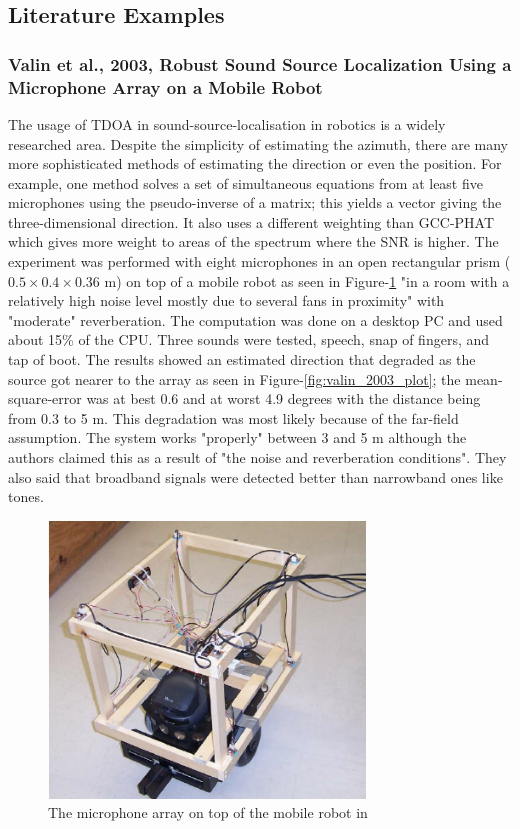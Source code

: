 \documentclass{report}
\begin{document}
\subsection{Literature Examples}

\subsubsection{Valin et al., 2003, Robust Sound Source Localization Using a Microphone Array on a Mobile Robot}

The usage of TDOA in sound-source-localisation in robotics is a widely researched area. Despite the simplicity of estimating the azimuth, there are many more sophisticated methods of estimating the direction or even the position. For example, one method \cite{valin_robust_2003} solves a set of simultaneous equations from at least five microphones using the pseudo-inverse of a matrix; this yields a vector giving the three-dimensional direction. It also uses a different weighting than GCC-PHAT which gives more weight to areas of the spectrum where the SNR is higher. The experiment was performed with eight microphones in an open rectangular prism ($0.5\times 0.4\times 0.36$ \si{m}) on top of a mobile robot as seen in Figure-\ref{fig:valin_2003_robot} "in a room with a relatively high noise level mostly due to several fans in proximity" with "moderate" reverberation. The computation was done on a desktop PC and used about 15\% of the CPU. Three sounds were tested, speech, snap of fingers, and tap of boot. The results showed an estimated direction that degraded as the source got nearer to the array as seen in Figure-\ref{fig:valin_2003_plot}; the mean-square-error was at best 0.6 and at worst 4.9 degrees with the distance being from 0.3 to 5 \si{m}. This degradation was most likely because of the far-field assumption. The system works "properly" between 3 and 5 \si{m} although the authors claimed this as a result of "the noise and reverberation conditions". They also said that broadband signals were detected better than narrowband ones like tones.

\begin{figure}[H]
\includegraphics[width=0.75\textwidth]{./valin_2003/robot.png}
\centering
\caption{The microphone array on top of the mobile robot in \cite{valin_robust_2003}}
\label{fig:valin_2003_robot}
\centering
\end{figure}
\end{document}
